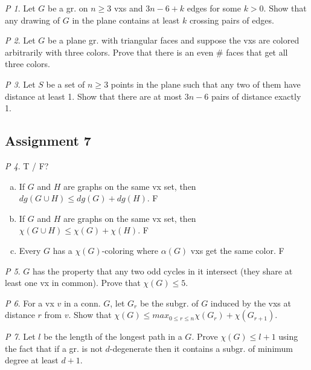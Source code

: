 \documentclass[11pt, fleqn, a4paper, landscape]{article}
\theoremstyle{plain} %
\theoremstyle{remark} %
\newtheorem{problem}{P}
\theoremstyle{definition} %
\begin{document}
\begin{multicols}{5}
\begin{problem}
Let $G$ be a gr. on $n\ge 3$ vxs and $3n- 6 + k$ edges for some $k > 0$. Show that any drawing of $G$ in the plane contains at least $k$ crossing pairs of edges.
\end{problem}

\begin{problem}
Let $G$ be a plane gr. with triangular faces and suppose the vxs are colored arbitrarily with three colors. Prove that there is an even \# faces that get all three colors.
\end{problem}

\begin{problem}
Let $S$ be a set of $n\ge 3$ points in the plane such that any two of them have distance at least 1. Show that there are at most $3n - 6$ pairs of distance exactly 1.
\end{problem}

\subsection{Assignment 7}

\begin{problem}
T / F?
\begin{enumerate}[(a)]
\item If $G$ and $H$ are graphs on the same vx set, then $dg(G \cup H)\le dg(G) + dg(H)$. F
\item If $G$ and $H$ are graphs on the same vx set, then $\chi(G \cup H) \le \chi(G) + \chi(H)$. F
\item Every $G$ has a $\chi(G)$-coloring where $\alpha(G)$ vxs get the same color. F
\end{enumerate}
\end{problem}

\begin{problem}
$G$ has the property that any two odd cycles in it intersect (they share at least one vx in common). Prove that $\chi(G) \le 5.$
\end{problem}

\begin{problem}
For a vx $v$ in a conn. $G$, let $G_r$ be the subgr. of $G$ induced by the vxs at distance $r$ from $v$. Show that $\chi(G) \le max_{0\le r\le n}\chi(G_r) + \chi(G_{r+1})$.
\end{problem}

\begin{problem}
Let $l$ be the length of the longest path in a $G$. Prove $\chi(G)\le l + 1$ using the fact that if a gr. is not $d$-degenerate then it contains a subgr. of minimum degree at least $d + 1$.
\end{problem}


\end{multicols}
\end{document}
